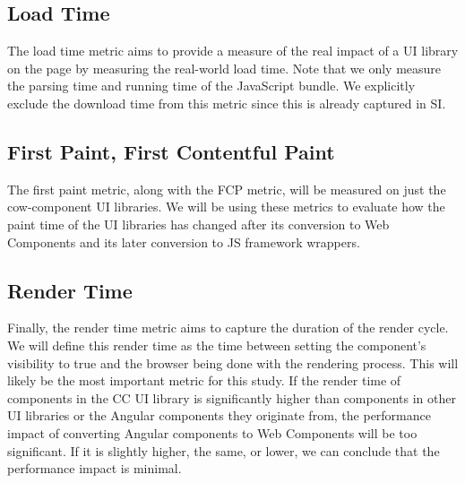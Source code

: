 \subsection{Load Time}
The load time metric aims to provide a measure of the real impact of a UI library on the page by measuring the real-world load time. Note that we only measure the parsing time and running time of the JavaScript bundle. We explicitly exclude the download time from this metric since this is already captured in SI\@.

\subsection{First Paint, First Contentful Paint}
The first paint metric, along with the FCP metric, will be measured on just the cow-component UI libraries. We will be using these metrics to evaluate how the paint time of the UI libraries has changed after its conversion to Web Components and its later conversion to JS framework wrappers.

\subsection{Render Time}
Finally, the render time metric aims to capture the duration of the render cycle. We will define this render time as the time between setting the component's visibility to true and the browser being done with the rendering process. This will likely be the most important metric for this study. If the render time of components in the CC UI library is significantly higher than components in other UI libraries or the Angular components they originate from, the performance impact of converting Angular components to Web Components will be too significant. If it is slightly higher, the same, or lower, we can conclude that the performance impact is minimal.

